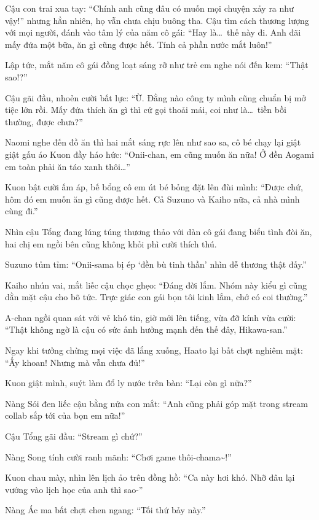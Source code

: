\documentclass[../main.tex]{subfiles}
\begin{document}
Cậu con trai xua tay: ``Chính anh cũng đâu có muốn mọi chuyện xảy ra như vậy!'' nhưng hẳn nhiên, họ vẫn chưa chịu buông tha. Cậu tìm cách thương lượng với mọi người, đánh vào tâm lý của năm cô gái: ``Hay là\dots\ thế này đi. Anh đãi mấy đứa một bữa, ăn gì cũng được hết. Tính cả phần nước mắt luôn!''

Lập tức, mắt năm cô gái đồng loạt sáng rỡ như trẻ em nghe nói đến kem: ``Thật sao!?''

Cậu gãi đầu, nhoẻn cười bất lực: ``Ừ. Đằng nào công ty mình cũng chuẩn bị mở tiệc lớn rồi. Mấy đứa thích ăn gì thì cứ gọi thoải mái, coi như là\dots\ tiền bồi thường, được chưa?''

Naomi nghe đến đồ ăn thì hai mắt sáng rực lên như sao sa, cô bé chạy lại giật giật gấu áo Kuon đầy háo hức: ``Onii-chan, em cũng muốn ăn nữa! Ở đền Aogami em toàn phải ăn táo xanh thôi\dots''

Kuon bật cười ấm áp, bế bổng cô em út bé bỏng đặt lên đùi mình: ``Được chứ, hôm đó em muốn ăn gì cũng được hết. Cả Suzuno và Kaiho nữa, cả nhà mình cùng đi.''

Nhìn cậu Tổng đang lúng túng thương thảo với dàn cô gái đang biểu tình đòi ăn, hai chị em ngồi bên cũng không khỏi phì cười thích thú.

Suzuno tủm tỉm: ``Onii-sama bị ép `đền bù tinh thần' nhìn dễ thương thật đấy.''

Kaiho nhún vai, mắt liếc cậu chọc ghẹo: ``Đáng đời lắm. Nhóm này kiểu gì cũng dằn mặt cậu cho bõ tức. Trực giác con gái bọn tôi kinh lắm, chớ có coi thường.''

A-chan ngồi quan sát với vẻ khó tin, giờ mới lên tiếng, vừa đỡ kính vừa cười: ``Thật không ngờ là cậu có sức ảnh hưởng mạnh đến thế đây, Hikawa-san.''

Ngay khi tưởng chừng mọi việc đã lắng xuống, Haato lại bất chợt nghiêm mặt: ``Ấy khoan! Nhưng mà vẫn chưa đủ!''

Kuon giật mình, suýt làm đổ ly nước trên bàn: ``Lại còn gì nữa?''

Nàng Sói đen liếc cậu bằng nửa con mắt: ``Anh cũng phải góp mặt trong stream collab sắp tới của bọn em nữa!''

Cậu Tổng gãi đầu: ``Stream gì chứ?''

Nàng Song tính cười ranh mãnh: ``Chơi game thôi-chama\~{}!''

Kuon chau mày, nhìn lên lịch ảo trên đồng hồ: ``Ca này hơi khó. Nhỡ đâu lại vướng vào lịch học của anh thì sao-''

Nàng Ác ma bất chợt chen ngang: ``Tối thứ bảy này.''
\end{document}
